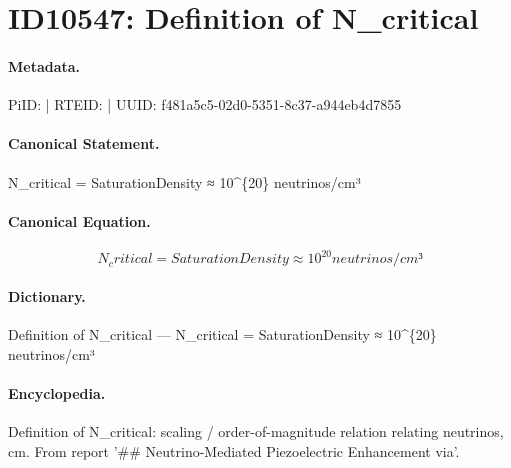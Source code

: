 \section*{ID10547: Definition of N\_critical}
\paragraph{Metadata.}
PiID:  | RTEID:  | UUID: f481a5c5-02d0-5351-8c37-a944eb4d7855

\paragraph{Canonical Statement.}
N\_critical = SaturationDensity ≈ 10\textasciicircum{}\{20\} neutrinos/cm³

\paragraph{Canonical Equation.}
\[
N_critical = SaturationDensity ≈ 10^{20} neutrinos/cm³
\]

\paragraph{Dictionary.}
Definition of N\_critical — N\_critical = SaturationDensity ≈ 10\textasciicircum{}\{20\} neutrinos/cm³

\paragraph{Encyclopedia.}
Definition of N\_critical: scaling / order-of-magnitude relation relating neutrinos, cm. From report '\#\# Neutrino-Mediated Piezoelectric Enhancement via'.
